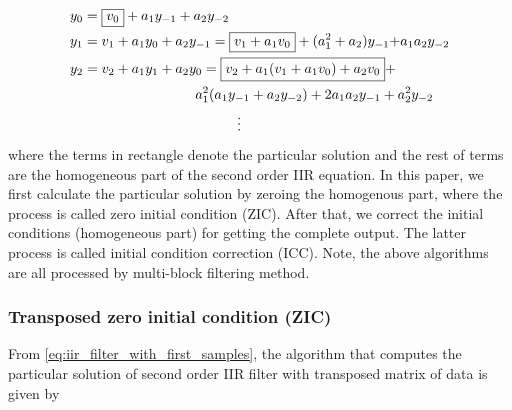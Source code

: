 \begin{equation}
    \label{eq:iir_filter_with_first_samples}
    \begin{aligned}
    & y_0 = \fbox{$v_0$} + a_1y_{-1} + a_2y_{-2} \\
    & y_1 = v_1 + a_1y_0 + a_2y_{-1} = \fbox{$v_1 + a_1v_0$} + (a_1^2+a_2)y_{-1}{+}a_1a_2y_{-2} \\
    & y_2 = v_2 + a_1y_1 + a_2y_0 = \fbox{$v_2 + a_1(v_1+a_1v_0) + a_2v_0$} + \\
    & \quad\quad\quad\quad\quad\quad\quad\quad\quad a_1^2(a_1y_{-1}+a_2y_{-2})+2a_1a_2y_{-1}+a_2^2y_{-2} \\
    & \quad\quad\quad\quad\quad\quad\quad\quad\quad\quad\quad\quad \vdots
    \end{aligned}
\end{equation}
where the terms in rectangle denote the particular solution and
the rest of terms are the homogeneous part of the second order IIR equation.
In this paper, we first calculate the particular solution by zeroing the homogenous part, where
the process is called zero initial condition (ZIC). After that, we correct the initial conditions (homogeneous part) for
getting the complete output. The latter process is called initial condition correction (ICC). Note, the above algorithms
are all processed by multi-block filtering method.

\subsubsection{Transposed zero initial condition (ZIC)}

From \eqref{eq:iir_filter_with_first_samples}, the algorithm that computes the particular solution 
of second order IIR filter with transposed matrix of data is given by

